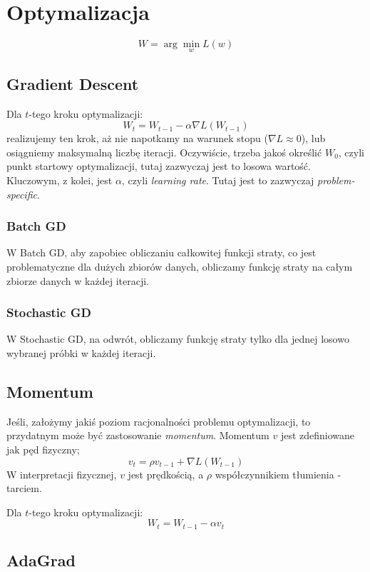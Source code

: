 \documentclass{../notatki}
\begin{document}
\section{Optymalizacja}

$$
W = \arg\min_w L(w)
$$

\subsection{Gradient Descent}

Dla $t$-tego kroku optymalizacji:
$$
W_{t} = W_{t-1} - \alpha \nabla L(W_{t-1})
$$
realizujemy ten krok, aż nie napotkamy na warunek stopu ($\nabla L \approx 0$),
lub osiągniemy maksymalną liczbę iteracji. Oczywiście, trzeba jakoś określić
$W_0$, czyli punkt startowy optymalizacji, tutaj zazwyczaj jest to
losowa wartość. Kluczowym, z kolei, jest $\alpha$, czyli \textit{learning rate}.
Tutaj jest to zazwyczaj \textit{problem-specific}.

\subsubsection{Batch GD}

W Batch GD, aby zapobiec obliczaniu całkowitej funkcji straty, co
jest problematyczne dla dużych zbiorów danych, obliczamy funkcję
straty na całym zbiorze danych w każdej iteracji.

\subsubsection{Stochastic GD}

W Stochastic GD, na odwrót, obliczamy funkcję straty tylko dla jednej
losowo wybranej próbki w każdej iteracji.

\subsection{Momentum}

Jeśli, założymy jakiś poziom racjonalności problemu optymalizacji, to przydatnym
może być zastosowanie \textit{momentum}. Momentum $v$ jest zdefiniowane jak
pęd fizyczny;
$$
v_{t} = \rho v_{t-1} + \nabla L(W_{t-1})
$$
W interpretacji fizycznej, $v$ jest prędkością, a $\rho$
współczynnikiem tłumienia - tarciem.

Dla $t$-tego kroku optymalizacji:
$$
W_{t} = W_{t-1} - \alpha v_{t}
$$

\subsection{AdaGrad}
\end{document}
